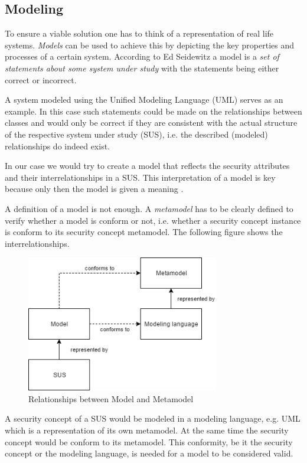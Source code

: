 \subsection{Modeling}
\label{subsec:interpretation}
To ensure a viable solution one has to think of a representation of real life systems. \textit{Models} can be used to achieve this by depicting the key properties and processes of a certain system. According to Ed Seidewitz \cite{seidewitz} a model is a \textit{\glqq set of statements about some system under study\grqq} with the statements being either correct or incorrect.

A system modeled using the Unified Modeling Language (UML) serves as an example. In this case such statements could be made on the relationships between classes and would only be correct if they are consistent with the actual structure of the respective system under study (SUS), i.e. the described (modeled) relationships do indeed exist. 

In our case we would try to create a model that reflects the security attributes and their interrelationships in a SUS. This interpretation of a model is key because only then the model is given a meaning \cite{seidewitz}.

A definition of a model is not enough. A \textit{metamodel} has to be clearly defined to verify whether a model is conform or not, i.e. whether a security concept instance is conform to its security concept metamodel. The following figure shows the interrelationships.

\begin{figure}[H]
\centering
\includegraphics[width=0.75\textwidth]{pictures/metamodel.png}
\caption{Relationships between Model and Metamodel}
\label{fig:metamodel}
\end{figure}

A security concept of a SUS would be modeled in a modeling language, e.g. UML which is a representation of its own metamodel. At the same time the security concept would be conform to its metamodel. This conformity, be it the security concept or the modeling language, is needed for a model to be considered valid. 

